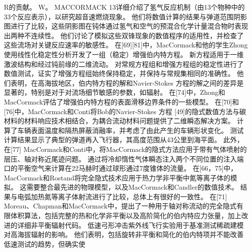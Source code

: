 \documentclass[UTF8,11pt,a4paper,openany,fontset=fandol]{ctexbook}
\begin{document}
R的贡献。 W。 MACCORMACK 13详细介绍了氢气反应机制（由13个物种中的33个反应表示），以研究超音速燃烧现象。 他们将数值计算的结果与弹道范围阴影图进行了比较，这些阴影图在钝体通过氢气和空气的预混合化学计量混合物时表现出两种不连续性。 他们讨论了模拟这些双锋现象的数值程序的适用性，并检查了这些流场对关键反应速率的敏感性。 在[69][81]中，MacCormack和他的学生Zhong使用线性化稳定性分析开发了一组（稳定）增强伯内特方程。 新方程适用于一维激波结构和经过钝前缘的二维流动。 对常规方程组和增强方程组的稳定性进行了数值测试，证实了增强方程组始终保持稳定，并保持与常规集相同的准确性。 他们表明，在高海拔地区，伯内特方程的解和Navier-Stokes 方程的解之间的差异是显著的，特别是对于对流场细节敏感的参数，如辐射。 在[74]中，Zhong和MacCormack评估了增强伯内特方程的表面滑移边界条件的一些模型。 在[70]和[76]中，MacCormack和Conti将Bob的Navier-Stokes 方程 [49]的隐式数值方法与碳材料的材料响应技术相结合，为耦合流动材料问题提供了二维瞬态解决方案。 计算了车辆表面温度和隔热屏蔽消融率，并考虑了由此产生的车辆形状变化。 测试计算结果显示了典型的弹道再入飞行器，其高度范围从43公里到海平面。 此外，在[77] MacCormack和Conti中，将MacCormack的隐式方法应用于带有气体喷射的层压、轴对称近尾迹问题。 通过将冷却惰性气体瞬态注入两个不同位置的注入端口的平衡空气来计算在22马赫时通过球形通过7度锥体的流量。 在[66，75]中，MacCormack和Rostand将完全隐式技术应用于热力学非平衡中氮等离子体的模拟。 这需要整合最先进的物理模型，以及MacCormack和Candler的数值技术。 结果与电弧加热氮等离子体射流进行了比较，总体上有很好的一致性。 在[71] Moreau、Chapman和MacCormack中，提出了一种用于轴对称流动的完全隐式有限体积算法，包括完整的热和化学非平衡以及高阶简化的伯内特应力张量，加上改进的详细非平衡辐射代码。 低速弓形冲击紫外线飞行实验用于基准测试稀疏建模对高海拔辐射的影响。 他们表明，包括旋转非平衡和简化的伯内特项并不能改善低速测试的趋势，但确实使
\end{document}
